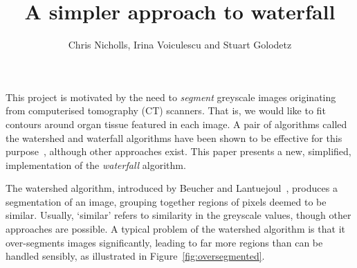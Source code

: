 \documentclass{article}
\title{\LARGE \bf
A simpler approach to waterfall
}
\author{Chris Nicholls, Irina Voiculescu and Stuart Golodetz
}
\begin{document}
\maketitle
\pagestyle{empty}

\iffalse
@@@

 - segmentation is
 - waterfall algorithm for segmentation
 - existing implementation (arguably overly complicated)
 - we have a better, simpler one
 - we will illustrate it on CT scans

It is useful to be able to identify particular features in a set of
images automatically. One application is in the treatment of cancer,
where algorithms can be used to aid the detection and classification
of organ and tumour tissue. This is the main motivation for this
project, although the algorithm presented is a generic one, with many
applications.
\fi

 This project is motivated by the need to {\em segment\/} greyscale
 images originating from computerised tomography (CT) scanners. That
 is, we would like to fit contours around organ tissue featured in
 each image. A pair of algorithms called the watershed and waterfall
 algorithms have been shown to be effective for this
 purpose~\cite{golodetz}, although other approaches exist. This paper
 presents a new, simplified, implementation of the {\em waterfall\/}
 algorithm.

The watershed algorithm, introduced by Beucher and
Lantuejoul~\cite{beucher79}, produces a segmentation of an image,
grouping together regions of pixels deemed to be similar. Usually,
`similar' refers to similarity in the greyscale values, though other
approaches are possible. A typical problem of the watershed algorithm
is that it over-segments images significantly, leading to far more
regions than can be handled sensibly, as illustrated in
Figure~\ref{fig:oversegmented}.
\end{document}
